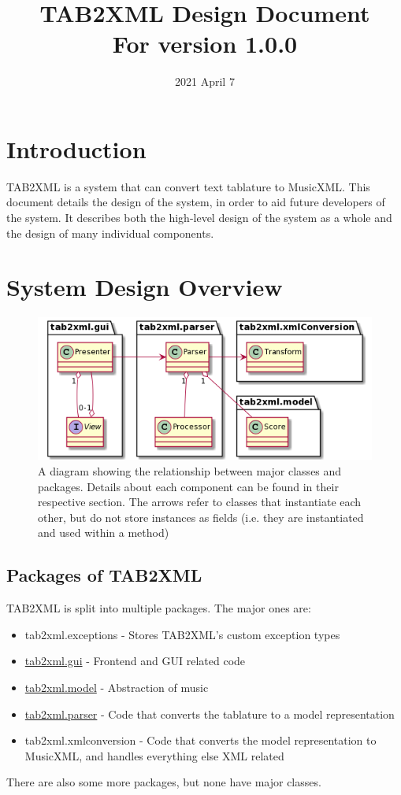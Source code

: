 \documentclass[11pt]{article}
\date{2021 April 7}
\title{TAB2XML Design Document\\\medskip
\large For version 1.0.0}
\begin{document}
\maketitle
\tableofcontents

\newpage

\section{Introduction}
\label{sec:org18ebf93}
TAB2XML is a system that can convert text tablature to MusicXML.  This document details the design of the system, in order to aid future developers of the system.  It describes both the high-level design of the system as a whole and the design of many individual components.
\section{System Design Overview}
\label{sec:org6ce6258}
\begin{figure}[htbp]
\centering
\includegraphics[width=.9\linewidth]{./Diagrams/full-system-diagram.png}
\caption{A diagram showing the relationship between major classes and packages.  Details about each component can be found in their respective section.  The arrows refer to classes that instantiate each other, but do not store instances as fields (i.e. they are instantiated and used within a method)}
\end{figure}

\subsection{Packages of TAB2XML}
\label{sec:org2392275}
TAB2XML is split into multiple packages.  The major ones are:
\begin{itemize}
\item tab2xml.exceptions - Stores TAB2XML's custom exception types
\item \hyperref[sec:orgce08d1f]{tab2xml.gui} - Frontend and GUI related code
\item \hyperref[sec:org567c544]{tab2xml.model} - Abstraction of music
\item \hyperref[sec:org258124a]{tab2xml.parser} - Code that converts the tablature to a model representation
\item tab2xml.xmlconversion - Code that converts the model representation to MusicXML, and handles everything else XML related
\end{itemize}
There are also some more packages, but none have major classes.
\end{document}
